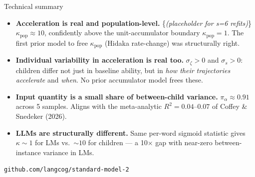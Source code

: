 \documentclass[
  ignorenonframetext,
  aspectratio=169,
  t]{beamer}
\providecommand{\tightlist}{%
  \setlength{\itemsep}{0pt}\setlength{\parskip}{0pt}}
\newcommand{\pia}{\pi_{\alpha}}
\newcommand{\sigz}{\sigma_{\zeta}}
\newcommand{\sigs}{\sigma_{s}}
\newcommand{\kappap}{\kappa_{\text{pop}}}
\begin{document}
\begin{frame}[fragile]{Technical summary}
\label{technical-summary}
\footnotesize

\begin{itemize}
\tightlist
\item
  \textbf{Acceleration is real and population-level.}
  \{\color{black!55}\textit{(placeholder for s=6 refits)}\}
  \(\kappap \approx 10\), confidently above the unit-accumulator
  boundary \(\kappap = 1\). The first prior model to free \(\kappap\)
  (Hidaka rate-change) was structurally right.
\item
  \textbf{Individual variability in acceleration is real too.}
  \(\sigz > 0\) and \(\sigs > 0\): children differ not just in baseline
  ability, but in \emph{how their trajectories accelerate} and
  \emph{when}. No prior accumulator model frees these.
\item
  \textbf{Input quantity is a small share of between-child variance.}
  \(\pia \approx 0.91\) across 5 samples. Aligns with the meta-analytic
  \(R^2 = 0.04\)--\(0.07\) of Coffey \& Snedeker (2026).
\item
  \textbf{LLMs are structurally different.} Same per-word sigmoid
  statistic gives \(\kappa \sim 1\) for LMs vs.~\(\sim 10\) for children
  --- a 10\(\times\) gap with near-zero between-instance variance in
  LMs.
\end{itemize}

\vspace{0.4em}

\centering\footnotesize \texttt{github.com/langcog/standard-model-2}
\end{frame}
\end{document}

